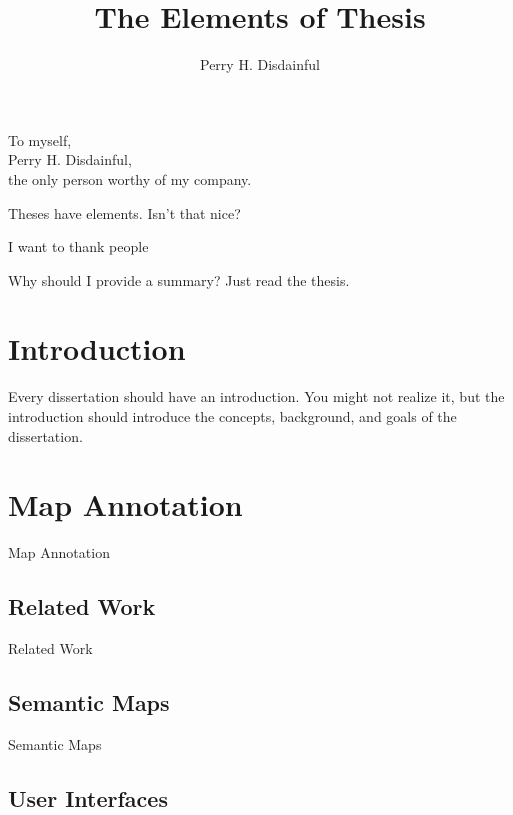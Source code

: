 \documentclass[12pt]{gatech-thesis}
\title{The Elements of Thesis} %
\author{Perry H. Disdainful}
\begin{document}

\begin{preliminary}
\begin{dedication}
\null\vfil
{\large
\begin{center}
To myself,\\\vspace{12pt}
Perry H. Disdainful,\\\vspace{12pt}
the only person worthy of my company.
\end{center}}
\vfil\null
\end{dedication}
\begin{preface}
Theses have elements.  Isn't that nice?
\end{preface}
\begin{acknowledgements}
I want to thank people
\end{acknowledgements}
\contents
\begin{summary}
Why should I provide a summary?  Just read the thesis.
\end{summary}
\end{preliminary}
\chapter{Introduction}

Every dissertation should have an introduction.  You might not realize
it, but the introduction should introduce the concepts, background,
and goals of the dissertation.

\chapter{Map Annotation}

Map Annotation

\section{Related Work}

Related Work

\section{Semantic Maps}

Semantic Maps

\section{User Interfaces}
\end{document}

